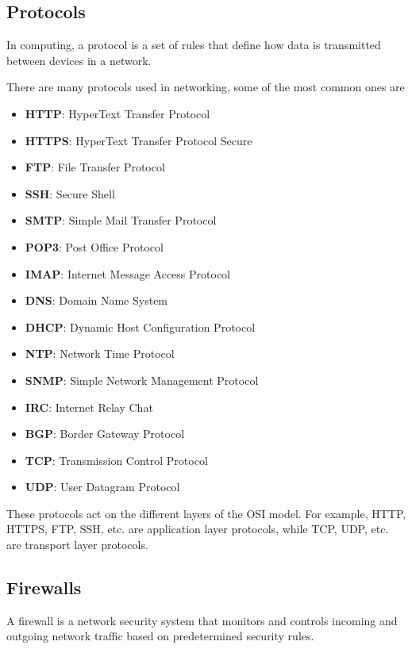 \subsection{Protocols}

\begin{definition}[Protocols]
In computing, a protocol is a set of rules that define
how data is transmitted between devices in a network.
\end{definition}

There are many protocols used in networking, some of
the most common ones are

\begin{itemize}
    \item \textbf{HTTP}: HyperText Transfer Protocol
    \item \textbf{HTTPS}: HyperText Transfer Protocol Secure
    \item \textbf{FTP}: File Transfer Protocol
    \item \textbf{SSH}: Secure Shell
    \item \textbf{SMTP}: Simple Mail Transfer Protocol
    \item \textbf{POP3}: Post Office Protocol
    \item \textbf{IMAP}: Internet Message Access Protocol
    \item \textbf{DNS}: Domain Name System
    \item \textbf{DHCP}: Dynamic Host Configuration Protocol
    \item \textbf{NTP}: Network Time Protocol
    \item \textbf{SNMP}: Simple Network Management Protocol
    \item \textbf{IRC}: Internet Relay Chat
    \item \textbf{BGP}: Border Gateway Protocol
    \item \textbf{TCP}: Transmission Control Protocol
    \item \textbf{UDP}: User Datagram Protocol
\end{itemize}

These protocols act on the different layers of the
OSI model. For example, HTTP, HTTPS, FTP, SSH, etc.
are application layer protocols, while TCP, UDP, etc.
are transport layer protocols.

\subsection{Firewalls}

\begin{definition}[Firewall]
  A firewall is a network security system that monitors
  and controls incoming and outgoing network traffic
  based on predetermined security rules.
\end{definition}

